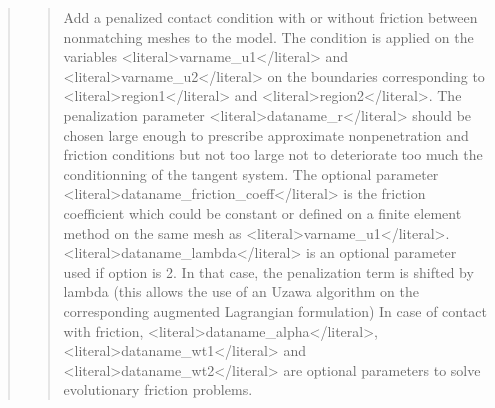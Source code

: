 \documentclass[a4paper,11pt,english]{sphinxmanual}
\begin{document}
\begin{quote}
\sphinxAtStartPar
{}
\begin{quote}

\sphinxAtStartPar
Add a penalized contact condition with or without friction between
nonmatching meshes to the model.
The condition is applied on the variables \textless{}literal\textgreater{}varname\_u1\textless{}/literal\textgreater{} and  \textless{}literal\textgreater{}varname\_u2\textless{}/literal\textgreater{}
on the boundaries corresponding to \textless{}literal\textgreater{}region1\textless{}/literal\textgreater{} and \textless{}literal\textgreater{}region2\textless{}/literal\textgreater{}.
The penalization parameter \textless{}literal\textgreater{}dataname\_r\textless{}/literal\textgreater{} should be chosen
large enough to prescribe approximate non\sphinxhyphen{}penetration and friction
conditions but not too large not to deteriorate too much the
conditionning of the tangent system.
The optional parameter \textless{}literal\textgreater{}dataname\_friction\_coeff\textless{}/literal\textgreater{} is the friction
coefficient which could be constant or defined on a finite element
method on the same mesh as \textless{}literal\textgreater{}varname\_u1\textless{}/literal\textgreater{}.
\textless{}literal\textgreater{}dataname\_lambda\textless{}/literal\textgreater{} is an optional parameter used if option
is 2. In that case, the penalization term is shifted by lambda (this
allows the use of an Uzawa algorithm on the corresponding augmented
Lagrangian formulation)
In case of contact with friction, \textless{}literal\textgreater{}dataname\_alpha\textless{}/literal\textgreater{}, \textless{}literal\textgreater{}dataname\_wt1\textless{}/literal\textgreater{} and
\textless{}literal\textgreater{}dataname\_wt2\textless{}/literal\textgreater{} are optional parameters to solve evolutionary friction
problems.
\end{quote}

\sphinxAtStartPar
{}
\begin{quote}


\end{quote}
\end{quote}
\end{document}
